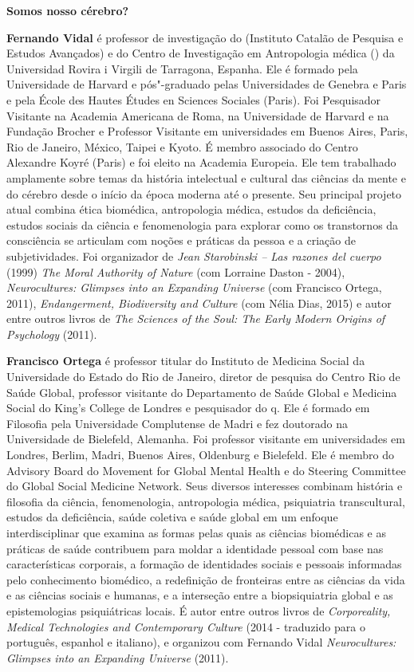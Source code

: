 \textbf{Somos nosso cérebro?} \lipsum[1]

\textbf{Fernando Vidal} é professor de investigação do  (Instituto
Catalão de Pesquisa e Estudos Avançados) e do Centro de Investigação em
Antropologia médica () da Universidad Rovira i Virgili de Tarragona,
Espanha. Ele é formado pela Universidade de Harvard e pós"-graduado pelas
Universidades de Genebra e Paris e pela École des Hautes Études en
Sciences Sociales (Paris). Foi Pesquisador Visitante na Academia
Americana de Roma, na Universidade de Harvard e na Fundação Brocher e
Professor Visitante em universidades em Buenos Aires, Paris, Rio de
Janeiro, México, Taipei e Kyoto. É membro associado do Centro Alexandre
Koyré (Paris) e foi eleito na Academia Europeia. Ele tem trabalhado
amplamente sobre temas da história intelectual e cultural das ciências
da mente e do cérebro desde o início da época moderna até o presente.
Seu principal projeto atual combina ética biomédica, antropologia
médica, estudos da deficiência, estudos sociais da ciência e
fenomenologia para explorar como os transtornos da consciência se
articulam com noções e práticas da pessoa e a criação de subjetividades.
Foi organizador de \emph{Jean Starobinski -- Las razones del cuerpo}
(1999) \emph{The Moral Authority of Nature} (com Lorraine Daston -
2004), \emph{Neurocultures: Glimpses into an Expanding Universe }(com
Francisco Ortega, 2011), \emph{Endangerment, Biodiversity and
Culture} (com Nélia Dias, 2015) e autor entre outros livros de \emph{The
Sciences of the Soul: The Early Modern Origins of Psychology} (2011).

\textbf{Francisco Ortega} é professor titular do Instituto de Medicina
Social da Universidade do Estado do Rio de Janeiro, diretor de pesquisa
do Centro Rio de Saúde Global, professor visitante do Departamento de
Saúde Global e Medicina Social do King's College de Londres e
pesquisador do q. Ele é formado em Filosofia pela Universidade
Complutense de Madri e fez doutorado na Universidade de Bielefeld,
Alemanha. Foi professor visitante em universidades em Londres, Berlim,
Madri, Buenos Aires, Oldenburg e Bielefeld. Ele é membro do Advisory
Board do Movement for Global Mental Health e do Steering Committee do
Global Social Medicine Network. Seus diversos interesses combinam
história e filosofia da ciência, fenomenologia, antropologia médica,
psiquiatria transcultural, estudos da deficiência, saúde coletiva e
saúde global em um enfoque interdisciplinar que examina as formas pelas
quais as ciências biomédicas e as práticas de saúde contribuem para
moldar a identidade pessoal com base nas características corporais, a
formação de identidades sociais e pessoais informadas pelo conhecimento
biomédico, a redefinição de fronteiras entre as ciências da vida e as
ciências sociais e humanas, e a interseção entre a biopsiquiatria global
e as epistemologias psiquiátricas locais. É autor entre outros livros de
\emph{Corporeality, Medical Technologies and Contemporary Culture} (2014
- traduzido para o português, espanhol e italiano), e organizou com
Fernando Vidal \emph{Neurocultures: Glimpses into an Expanding Universe}
(2011).


